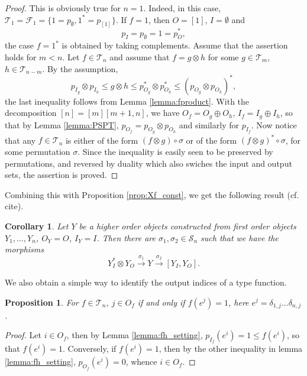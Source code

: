\documentclass[12pt]{article}
\newtheorem{coro}{Corollary}
\newtheorem{prop}{Proposition}
\theoremstyle{definition}
\theoremstyle{remark}
\def\Te{\mathcal T}
\def\Fe{\mathcal F}
\def\permut{\mathscr{S}}
\begin{document}
\begin{proof} This is obviously true for $n=1$. Indeed, in this case,
$\Te_1=\Fe_1=\{1=p_\emptyset,1^*=p_{[1]}\}$. If $f=1$, then $O=[1]$, $I=\emptyset$ and 
\[
p_I=p_{\emptyset}=1=p_O^*,
\]
the case  $f=1^*$ is obtained by taking complements. Assume that the assertion holds for
$m<n$. Let $f\in \Te_n$ and assume that  $f=g\otimes h$ for some  $g\in
\Te_m$, $h\in \Te_{n-m}$.  By the assumption,
\[
p_{I_g}\otimes p_{I_h}\le g\otimes h\le p^*_{O_g}\otimes p^*_{O_h}\le (p_{O_g}\otimes
p_{O_h})^*,
\]
the last inequality follows from Lemma \ref{lemma:fproduct}. With the decomposition
$[n]=[m][m+1,n]$, we have   
$O_f=O_g\oplus O_h$, $I_f=I_g\oplus I_h$, so that by Lemma \ref{lemma:PSPT}, 
$p_{O_f}=p_{O_g}\otimes p_{O_h}$ and
similarly for $p_{I_f}$. Now notice that any $f\in \Te_n$ is either of the form $(f\otimes
g)\circ \sigma$ or of the form $(f\otimes g)^*\circ \sigma$, for some permutation
$\sigma$. Since the inequality is easily seen to be preserved by
permutations, and reversed by duality which also swiches the input and output sets, the
assertion is proved.

\end{proof}


Combining this with Proposition \ref{prop:Xf_const}, we get the following result
(cf. cite). 

\begin{coro}\label{coro:setting} Let $Y$ be a higher order objects constructed from
first order objects $Y_1,\dots, Y_n$,  $O_Y=O$,
$I_Y=I$.  Then there are
$\sigma_1,\sigma_2\in \permut_n$ such that we have the  morphisms 
\[
Y_I^*\otimes Y_O\xrightarrow{\sigma_1} Y
\xrightarrow{\sigma_2} [Y_I, Y_O].
\]
 


\end{coro}



We also obtain  a simple  way to identify the output indices  of a type
function.

\begin{prop}\label{prop:fh_outputs} For $f\in \Te_n$, $j\in O_f$ if and only if
$f(e^j)=1$, here $e^j=\delta_{1,j}\dots\delta_{n,j}$.


\end{prop}


\begin{proof} Let $i\in O_f$, then by Lemma \ref{lemma:fh_setting}, $p_{I_f}(e^i)=1\le
f(e^i)$, so that $f(e^i)=1$. Conversely, if $f(e^i)=1$, then by the other inequality in
lemma \ref{lemma:fh_setting}, $p_{O_f}(e^i)=0$, whence $i\in O_f$.


\end{proof}
\end{document}
